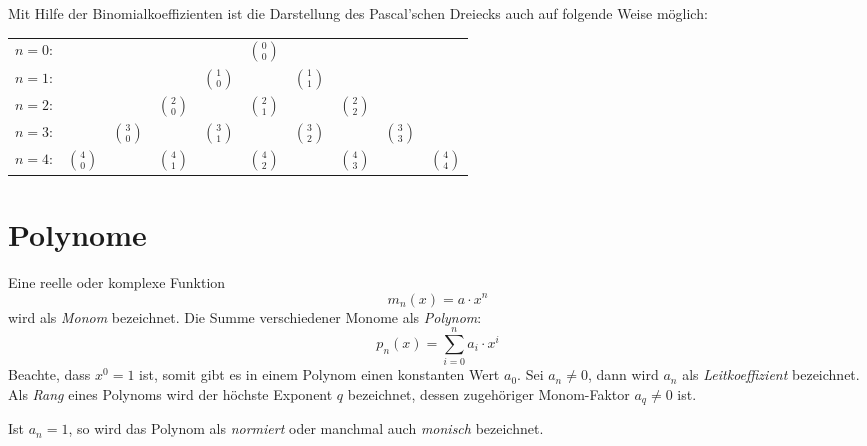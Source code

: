 \bigskip

Mit Hilfe der Binomialkoeffizienten ist die Darstellung des Pascal'schen Dreiecks auch auf folgende Weise möglich:

\begin{center}
\begin{tabular}{rccccccccc} 
$n=0$:& & & & & $\binom{0}{0}$\\
\noalign{\smallskip} $n=1$:& & & & $\binom{1}{0}$ & & $\binom{1}{1}$\\
\noalign{\smallskip} $n=2$:& & & $\binom{2}{0}$ & & $\binom{2}{1}$ & & $\binom{2}{2}$\\
\noalign{\smallskip} $n=3$:& & $\binom{3}{0}$ & & $\binom{3}{1}$ & & $\binom{3}{2}$ & & $\binom{3}{3}$\\
\noalign{\smallskip} $n=4$:& $\binom{4}{0}$ & & $\binom{4}{1}$ & & $\binom{4}{2}$ & & $\binom{4}{3}$ & & $\binom{4}{4}$
\end{tabular}
\end{center}


\section{Polynome}\label{chap:poly}

\begin{definition}
Eine reelle oder komplexe Funktion
\[ m_n(x) = a\cdot x^n  \]
wird als \textsl{Monom} bezeichnet. Die Summe verschiedener Monome als \textsl{Polynom}:
\[
p_n(x) = \sum_{i=0}^{n} a_i \cdot x^i
\]
Beachte, dass $x^0 = 1$ ist, somit gibt es in einem Polynom einen konstanten Wert $a_0$. Sei $a_n\ne 0$, dann wird $a_n$ als \textsl{Leitkoeffizient} bezeichnet. Als \textsl{Rang} eines Polynoms wird der höchste Exponent $q$ bezeichnet, dessen zugehöriger Monom-Faktor $a_q \ne 0$ ist.

Ist $a_n = 1$, so wird das Polynom als \textsl{normiert} oder manchmal auch \textsl{monisch} bezeichnet.
\end{definition}


